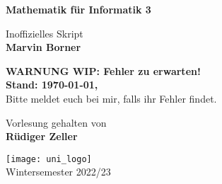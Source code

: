 \begin{titlepage}
	\begin{center}
		\vspace*{1cm}

		{\huge\textbf{Mathematik für Informatik 3}}

		\vspace{0.5cm}
		{\Large Inoffizielles Skript}\\
		\textbf{Marvin Borner}

		\vfill
		{\Large \textbf{WARNUNG WIP: Fehler zu erwarten!}\\\textbf{Stand: \today, \currenttime}}\\
		{\large Bitte meldet euch bei mir, falls ihr Fehler findet.}
		\vfill

		Vorlesung gehalten von\\
		\textbf{Rüdiger Zeller}

		\vspace{0.8cm}

		\texttt{[image: uni\_logo]}\\
		Wintersemester 2022/23
	\end{center}
\end{titlepage}
